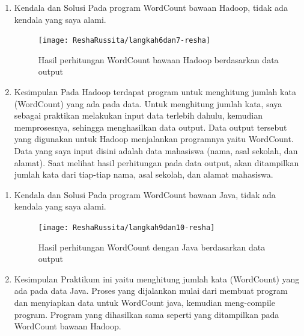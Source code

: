 \begin{enumerate}
\item Kendala dan Solusi
\newline Pada program WordCount bawaan Hadoop, tidak ada kendala yang saya alami.

\begin{figure}[!ht]
\texttt{[image: ReshaRussita/langkah6dan7-resha]}
\caption{Hasil perhitungan WordCount bawaan Hadoop berdasarkan data output}
\label{gam:perkuliahan-08-12}
\end{figure}

\item Kesimpulan
\newline Pada Hadoop terdapat program untuk menghitung jumlah kata (WordCount) yang ada pada data. Untuk menghitung jumlah kata, saya sebagai praktikan melakukan input data terlebih dahulu, kemudian memprosesnya, sehingga menghasilkan data output. Data output tersebut yang digunakan untuk Hadoop menjalankan programnya yaitu WordCount.
Data yang saya input disini adalah data mahasiswa (nama, asal sekolah, dan alamat). Saat melihat hasil perhitungan pada data output, akan ditampilkan jumlah kata dari tiap-tiap nama, asal sekolah, dan alamat mahasiswa.

\end{enumerate}

\begin{enumerate}
\item Kendala dan Solusi
\newline Pada program WordCount bawaan Java, tidak ada kendala yang saya alami.

\begin{figure}[!ht]
\texttt{[image: ReshaRussita/langkah9dan10-resha]}
\caption{Hasil perhitungan WordCount dengan Java berdasarkan data output}
\label{gam:perkuliahan-08-12}
\end{figure}

\item Kesimpulan
\newline Praktikum ini yaitu menghitung jumlah kata (WordCount) yang ada pada data Java. Proses yang dijalankan mulai dari membuat program dan menyiapkan data untuk WordCount java, kemudian meng-compile program. Program yang dihasilkan sama seperti yang ditampilkan pada WordCount bawaan Hadoop.
\end{enumerate}


